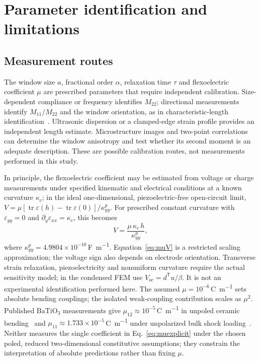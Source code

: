 \FloatBarrier
\section{Parameter identification and limitations}
\label{sec:calibration}

\subsection{Measurement routes}
\label{sec:calib_a_mu}

The window size $a$, fractional order $\alpha$, relaxation time $\tau$ and
flexoelectric coefficient $\mu$ are prescribed parameters that require independent calibration. Size-dependent compliance or frequency identifies
$M_{22}$; directional measurements identify $M_{11}/M_{22}$ and the window
orientation, as in characteristic-length identification~\cite{fem1}.
Ultrasonic dispersion or a clamped-edge strain profile provides an independent
length estimate. Microstructure images and two-point correlations can determine
the window anisotropy and test whether its second moment is an adequate
description. These are possible calibration routes, not measurements performed
in this study.

In principle, the flexoelectric coefficient may be estimated from voltage
or charge measurements under specified kinematic and electrical conditions at a known curvature $\kappa_c$; in the ideal one-dimensional, piezoelectric-free open-circuit limit,
$V=\mu[\operatorname{tr}\varepsilon(h)-\operatorname{tr}\varepsilon(0)]/\kappa^p_{yy}$.
For prescribed constant curvature with $\varepsilon_{yy}=0$ and
$\partial_y\varepsilon_{xx}=\kappa_c$, this becomes
\begin{equation}
  V = \frac{\mu\,\kappa_c\,h}{\kappa^{p}_{yy}},
  \label{eq:muV}
\end{equation}
where $\kappa^{p}_{yy}=4.9804\times10^{-10}$\,\si{\farad\per\meter}.
Equation~\eqref{eq:muV} is a restricted scaling approximation; the voltage sign
also depends on electrode orientation. Transverse strain relaxation,
piezoelectricity and nonuniform curvature require the actual sensitivity
model; in the condensed FEM use $V_{oc}=d^{\mathsf T}u/\beta$.
It is not an experimental identification performed here. The assumed $\mu=10^{-6}$\,\si{\coulomb\per\meter} sets absolute
bending couplings; the isolated weak-coupling contribution scales as $\mu^2$.
Published BaTiO$_3$ measurements give $\mu_{12}\approx10^{-5}$\,\si{\coulomb\per\meter}
in unpoled ceramic bending~\cite{MaCross2006} and
$\mu_{11}\approx1.733\times10^{-5}$\,\si{\coulomb\per\meter}
under unpolarized bulk shock loading~\cite{HuDengLiangShen2017}.
Neither measures the single coefficient in Eq.~\eqref{eq:muexplicit} under
the chosen poled, reduced two-dimensional constitutive assumptions; they
constrain the interpretation of absolute predictions rather than fixing $\mu$.


